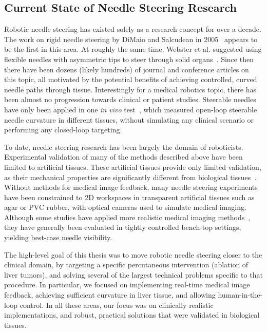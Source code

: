 \subsection{Current State of Needle Steering Research}
Robotic needle steering has existed solely as a research concept for over a decade. The work on rigid needle steering by DiMaio and Salcudean in 2005~\cite{DiMaio2005} appears to be the first in this area. At roughly the same time, Webster et al. suggested using flexible needles with asymmetric tips to steer through solid organs~\cite{Webster2005}. Since then there have been dozens (likely hundreds) of journal and conference articles on this topic, all motivated by the potential benefits of achieving controlled, curved needle paths through tissue. Interestingly for a medical robotics topic, there has been almost no progression towards clinical or patient studies. Steerable needles have only been applied in one \textit{in vivo} test~\cite{Majewicz2012}, which measured open-loop steerable needle curvature in different tissues, without simulating any clinical scenario or performing any closed-loop targeting.

To date, needle steering research has been largely the domain of roboticists. Experimental validation of many of the methods described above have been limited to artificial tissues. These artificial tissues provide only limited validation, as their mechanical properties are significantly different from biological tissues~\cite{Wedlick2012}. Without methods for medical image feedback, many needle steering experiments have been constrained to 2D workspaces in transparent artificial tissues such as agar or PVC rubber, with optical cameras used to simulate medical imaging. Although some studies have applied more realistic medical imaging methods~\cite{Glozman2007,Neubach2010,Abayazid2014}, they have generally been evaluated in tightly controlled bench-top settings, yielding best-case needle visibility.

The high-level goal of this thesis was to move robotic needle steering closer to the clinical domain, by targeting a specific percutaneous intervention (ablation of liver tumors), and solving several of the largest technical problems specific to that procedure. In particular, we focused on implementing real-time medical image feedback, achieving sufficient curvature in liver tissue, and allowing human-in-the-loop control. In all these areas, our focus was on clinically realistic implementations, and robust, practical solutions that were validated in biological tissues.  

